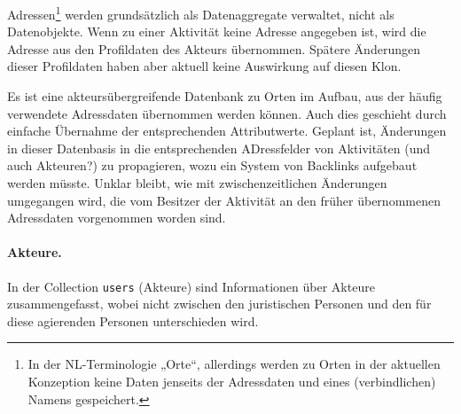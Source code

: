 \documentclass[a4paper,11pt]{article}
\begin{document}
Adressen\footnote{In der NL-Terminologie „Orte“, allerdings werden zu Orten in
  der aktuellen Konzeption keine Daten jenseits der Adressdaten und eines
  (verbindlichen) Namens gespeichert.} werden grundsätzlich als Datenaggregate
verwaltet, nicht als Datenobjekte.  Wenn zu einer Aktivität keine Adresse
angegeben ist, wird die Adresse aus den Profildaten des Akteurs übernommen.
Spätere Änderungen dieser Profildaten haben aber aktuell keine Auswirkung auf
diesen Klon.

Es ist eine akteursübergreifende Datenbank zu Orten im Aufbau, aus der häufig
verwendete Adressdaten übernommen werden können.  Auch dies geschieht durch
einfache Übernahme der entsprechenden Attributwerte. Geplant ist, Änderungen
in dieser Datenbasis in die entsprechenden ADressfelder von Aktivitäten (und
auch Akteuren?) zu propagieren, wozu ein System von Backlinks aufgebaut werden
müsste. Unklar bleibt, wie mit zwischenzeitlichen Änderungen umgegangen wird,
die vom Besitzer der Aktivität an den früher übernommenen Adressdaten
vorgenommen worden sind.

\paragraph{Akteure.}
In der Collection \texttt{users} (Akteure) sind Informationen über Akteure
zusammengefasst, wobei nicht zwischen den juristischen Personen und den für
diese agierenden Personen unterschieden wird. 
\end{document}
